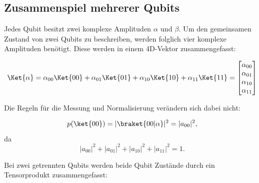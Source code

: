 \newline \newline
\subsection{Zusammenspiel mehrerer Qubits}
\newline
Jedes Qubit besitzt zwei komplexe Amplituden \(\alpha\) und \(\beta\). Um den gemeinsamen Zustand von zwei Qubits zu beschreiben, werden folglich vier komplexe Amplituden benötigt. Diese werden in einem 4D-Vektor zusammengefasst:

\begin{equation}
    \Ket{\alpha} = \alpha_{00} \Ket{00} + \alpha_{01}  \Ket{01} + \alpha_{10}  \Ket{10} + \alpha_{11}  \Ket{11} = \begin{bmatrix} \alpha_{00} \\ \alpha_{01} \\ \alpha_{10} \\ \alpha_{11} \\  \end{bmatrix}
\end{equation}

Die Regeln für die Messung und Normalisierung verändern sich dabei nicht:

\[p(\ket{00}) = | \braket{00 | \alpha} |^2 = |a_{00}|^2, \]
da
\[|a_{00}|^2 + |a_{01}|^2 + |a_{10}|^2 + |a_{11}|^2 = 1. \]

Bei zwei getrennten Qubits werden beide Qubit Zustände durch ein Tensorprodukt zusammengefasst:

